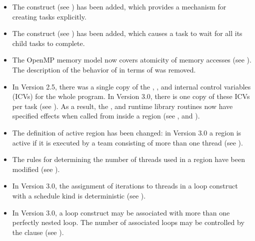 \begin{itemize}
\item The  construct (see 
) 
has been added, which provides 
a mechanism for creating tasks explicitly. 

\item The  construct (see 
) has been added, which 
causes a task to wait for all its child tasks to complete. 

\item The OpenMP memory model now covers atomicity of memory accesses (see 
). 
The description of the behavior of  in terms of 
 was removed.

\item In Version 2.5, there was a single copy of the , ,  and 
 internal control variables (ICVs) for the whole program. In Version 
3.0, there is one copy of these ICVs per task (see 
). As a result, 
the ,  and  
runtime library routines now have specified effects when called from inside a 
 region (see 
, 
 and 
). 

\item The definition of active  region has been changed: in Version 3.0 a 
 region is active if it is executed by a team consisting of more than one 
thread (see 
). 

\item The rules for determining the number of threads used in a  region have 
been modified (see 
). 

\item In Version 3.0, the assignment of iterations to threads in a loop construct with a 
 schedule kind is deterministic (see 
). 

\item In Version 3.0, a loop construct may be associated with more than one perfectly 
nested loop. The number of associated loops may be controlled by the  
clause (see 
). 


\end{itemize}
